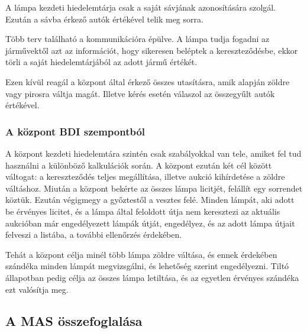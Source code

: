 \documentclass[a4paper, 11pt]{article}
\begin{document}
A lámpa kezdeti hiedelemtárja csak a saját sávjának azonosítására szolgál. Ezután a sávba érkező autók
értékével telik meg sorra.

Több terv található a kommunikációra épülve. A lámpa tudja fogadni az járművektől azt az információt, hogy
sikeresen beléptek a kereszteződésbe, ekkor törli a saját hiedelemtárjából az adott jármű értékét.

Ezen kívül reagál a központ által érkező összes utasításra, amik alapján zöldre vagy pirosra váltja magát.
Illetve kérés esetén válaszol az összegyűlt autók értékével.

\subsubsection{A központ BDI szempontból}
A központ kezdeti hiedelemtára szintén csak szabályokkal van tele, amiket fel tud használni a különböző
kalkulációk során. A központ ezután két cél között váltogat: a kereszteződés teljes megállítása, illetve
aukció kihírdetése a zöldre váltáshoz. Miután a központ bekérte az összes lámpa licitjét, felállít egy sorrendet
köztük. Ezután végigmegy a győztestől a vesztes felé. Minden lámpát, aki adott be érvényes licitet, és
a lámpa által feloldott útja nem keresztezi az aktuális aukcióban már engedélyezett lámpák útját, engedélyez,
és az adott lámpa útjait felveszi a listába, a további ellenőrzés érdekében.

Tehát a központ célja minél több lámpa zöldre váltása, és ennek érdekében szándéka minden lámpát megvizsgálni,
és lehetőség szerint engedélyezni. Tiltó állapotban pedig célja az összes lámpa letiltása, és az egyetlen érvényes
szándéka ezt valósítja meg.
\subsection{A MAS összefoglalása}
\end{document}
